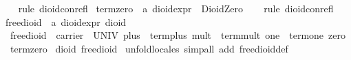 \begin{isabellebody}
%
\isadelimproof
\ \ %
\endisadelimproof
%
\isatagproof
{}\isamarkupfalse%
\ {}rule\ dioid{}con{}refl{}%
\endisatagproof
{\isafoldproof}%
%
\isadelimproof
\isanewline
%
\endisadelimproof
\isanewline
{}\isamarkupfalse%
\ term{}zero\ {}{}\ {}{}a\ dioid{}expr{}\ \ DioidZero\isanewline
%
\isadelimproof
\ \ %
\endisadelimproof
%
\isatagproof
{}\isamarkupfalse%
\ {}rule\ dioid{}con{}refl{}%
\endisatagproof
{\isafoldproof}%
%
\isadelimproof
\isanewline
%
\endisadelimproof
\isanewline
{}\isamarkupfalse%
\ free{}dioid\ {}{}\ {}{}a\ dioid{}expr\ dioid{}\ \isanewline
\ \ {}free{}dioid\ {}\ {}carrier\ {}\ UNIV{}\ plus\ {}\ term{}plus{}\ mult\ {}\ term{}mult{}\ one\ {}\ term{}one{}\ zero\ {}\ term{}zero{}{}\isanewline
\isanewline
{}\isamarkupfalse%
\ {}dioid\ free{}dioid{}\isanewline
%
\isadelimproof
%
\endisadelimproof
%
\isatagproof
{}\isamarkupfalse%
\ {}unfold{}locales{}\ simp{}all\ add{}\ free{}dioid{}def{}\isanewline

\end{isabellebody}
